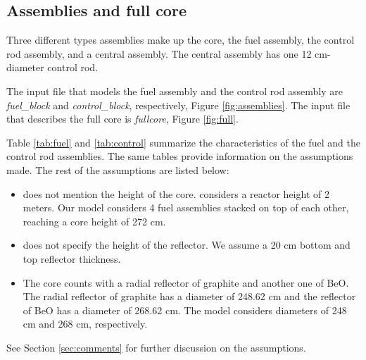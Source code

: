 \documentclass[11pt,letterpaper]{article}
\begin{document}
\subsection{Assemblies and full core}

Three different types assemblies make up the core, the fuel assembly, the control rod assembly, and a central assembly.
The central assembly has one 12 cm-diameter control rod.

The input file that models the fuel assembly and the control rod assembly are \textit{fuel\_block} and \textit{control\_block}, respectively, Figure \ref{fig:assemblies}.
The input file that describes the full core is \textit{fullcore}, Figure \ref{fig:full}.

Table \ref{tab:fuel} and \ref{tab:control} summarize the characteristics of the fuel and the control rod assemblies.
The same tables provide information on the assumptions made.
The rest of the assumptions are listed below:

\begin{itemize}
	\item \cite{hawari_development_2018} does not mention the height of the core. \cite{venneri_neutronic_2015} considers a reactor height of 2 meters. Our model considers 4 fuel assemblies stacked on top of each other, reaching a core height of 272 cm.
	\item \cite{hawari_development_2018} does not specify the height of the reflector. We assume a 20 cm bottom and top reflector thickness.
	\item The core counts with a radial reflector of graphite and another one of BeO.
	The radial reflector of graphite has a diameter of 248.62 cm and the reflector of BeO has a diameter of 268.62 cm\cite{hawari_development_2018}.
	The model considers diameters of 248 cm and 268 cm, respectively.

\end{itemize}

See Section \ref{sec:comments} for further discussion on the assumptions.
\end{document}

